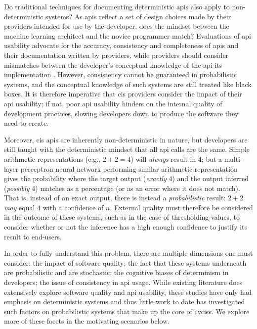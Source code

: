 Do traditional techniques for documenting deterministic \glspl{api} also apply to non-deterministic systems? As \glspl{api} reflect a set of design choices made by their providers intended for use by the developer, does the mindset between the machine learning architect and the novice programmer match? Evaluations of \gls{api} usability advocate for the accuracy, consistency and completeness of \glspl{api} and their documentation \citep{Piccioni:2013em,Robillard:2009uk} written by providers, while providers should consider mismatches between the developer's conceptual knowledge of the \gls{api} its implementation \citep{Ko:2011fb}. However, consistency cannot be guaranteed in probabilistic systems, and the conceptual knowledge of such systems are still treated like black boxes. It is therefore imperative that \gls{cis} providers consider the impact of their \gls{api} usability; if not, poor \gls{api} usability hinders on the internal quality of development practices, slowing developers down to produce the software they need to create.

Moreover, \gls{cis} \glspl{api} are inherently non-deterministic in nature, but developers are still taught with the deterministic mindset that all \gls{api} calls are the same. Simple arithmetic representations (e.g., $2+2=4$) will \textit{always} result in 4; but a multi-layer perceptron neural network performing similar arithmetic representation \citep{Blake:1998vd} gives the probability where the target output (\textit{exactly} 4) and the output inferred (\textit{possibly} 4) matches as a percentage (or as an error where it does not match). That is, instead of an exact output, there is instead a \textit{probabilistic} result: $2+2$ \textit{may} equal 4 with a confidence of $n$. External quality must therefore be considered in the outcome of these systems, such as in the case of thresholding values, to consider whether or not the inference has a high enough confidence to justify its result to end-users.

In order to fully understand this problem, there are multiple dimensions one must consider: the impact of software quality; the fact that these systems underneath are probabilistic and are stochastic; the cognitive biases of determinism in developers; the issue of consistency in \gls{api} usage. While existing literature does extensively explore software quality and \gls{api} usability, these studies have only had emphasis on deterministic systems and thus little work to date has investigated such factors on probabilistic systems that make up the core of \glspl{cvcis}. We explore more of these facets in the motivating scenarios below.

